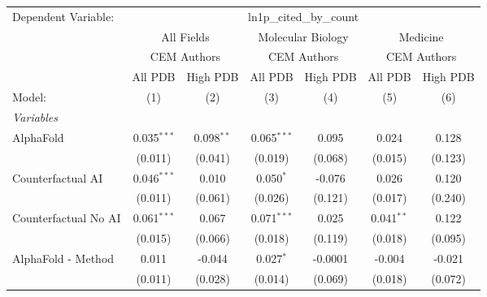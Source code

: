 \begingroup
\centering
\begin{tabular}{lcccccc}
   \tabularnewline \midrule \midrule
   Dependent Variable: & \multicolumn{6}{c}{ln1p\_cited\_by\_count}\\
 & \multicolumn{2}{c}{All Fields} & \multicolumn{2}{c}{Molecular Biology} & \multicolumn{2}{c}{Medicine} \\
\cmidrule(lr){2-3} \cmidrule(lr){4-5} \cmidrule(lr){6-7}
 & \multicolumn{2}{c}{CEM Authors} & \multicolumn{2}{c}{CEM Authors} & \multicolumn{2}{c}{CEM Authors} \\
\cmidrule(lr){2-3} \cmidrule(lr){4-5} \cmidrule(lr){6-7}
 & \multicolumn{1}{c}{All PDB} & \multicolumn{1}{c}{High PDB} & \multicolumn{1}{c}{All PDB} & \multicolumn{1}{c}{High PDB} & \multicolumn{1}{c}{All PDB} & \multicolumn{1}{c}{High PDB} \\
\cmidrule(lr){2-2} \cmidrule(lr){3-3} \cmidrule(lr){4-4} \cmidrule(lr){5-5} \cmidrule(lr){6-6} \cmidrule(lr){7-7}
   Model:                                                     & (1)            & (2)          & (3)           & (4)     & (5)            & (6)\\  
   \midrule
   \emph{Variables}\\
   AlphaFold                                                  & 0.035$^{***}$  & 0.098$^{**}$ & 0.065$^{***}$ & 0.095   & 0.024          & 0.128\\   
                                                              & (0.011)        & (0.041)      & (0.019)       & (0.068) & (0.015)        & (0.123)\\   
   Counterfactual AI                                          & 0.046$^{***}$  & 0.010        & 0.050$^{*}$   & -0.076  & 0.026          & 0.120\\   
                                                              & (0.011)        & (0.061)      & (0.026)       & (0.121) & (0.017)        & (0.240)\\   
   Counterfactual No AI                                       & 0.061$^{***}$  & 0.067        & 0.071$^{***}$ & 0.025   & 0.041$^{**}$   & 0.122\\   
                                                              & (0.015)        & (0.066)      & (0.018)       & (0.119) & (0.018)        & (0.095)\\   
   AlphaFold - Method                                         & 0.011          & -0.044       & 0.027$^{*}$   & -0.0001 & -0.004         & -0.021\\   
                                                              & (0.011)        & (0.028)      & (0.014)       & (0.069) & (0.018)        & (0.072)\\   

\end{tabular}
